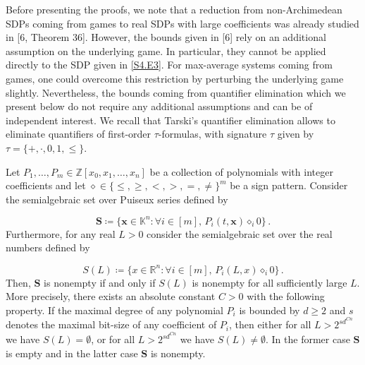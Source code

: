 Before presenting the proofs, we note that a reduction from non-Archimedean SDPs coming from games to real SDPs with large coefficients was already studied in [6, Theorem 36]. However, the bounds given in [6] rely on an additional assumption on the underlying game. In particular, they cannot be applied directly to the SDP given in \eqref{S4.E3}. For max-average systems coming from games, one could overcome this restriction by perturbing the underlying game slightly. Nevertheless, the bounds coming from quantifier elimination which we present below do not require any additional assumptions and can be of independent interest. We recall that Tarski’s quantifier elimination allows to eliminate quantifiers of first-order $\tau$-formulas, with signature $\tau$ given by $\tau=\{+,\cdot,0,1,\leq\}$.

\setcounter{theorem}{6}
\begin{theorem}\label{Thmtheorem7}
Let $P_{1},\dots,P_{m}\in\mathbb{Z}[x_{0},x_{1},\dots,x_{n}]$ be a collection of polynomials with integer coefficients and let $\diamond\in\{\leq,\geq,<,>,=,\neq\}^{m}$ be a sign pattern. Consider the semialgebraic set over Puiseux series defined by


\[
\bm{S}\coloneqq\{\bm{x}\in\mathbb{K}^{n}\colon\forall i\in[m],\,P_{i}(t,\bm{x})\diamond_{i}0\}\,.
\]
Furthermore, for any real $L>0$ consider the semialgebraic set over the real numbers defined by


\[
S(L)\coloneqq\{x\in\mathbb{R}^{n}\colon\forall i\in[m],\,P_{i}(L,x)\diamond_{i}0\}\,.
\]
Then, $\bm{S}$ is nonempty if and only if $S(L)$ is nonempty for all sufficiently large $L$. More precisely, there exists an absolute constant $C>0$ with the following property. If the maximal degree of any polynomial $P_{i}$ is bounded by $d\geq 2$ and $s$ denotes the maximal bit-size of any coefficient of $P_{i}$, then either for all $L>2^{sd^{Cn}}$ we have $S(L)=\emptyset$, or for all $L>2^{sd^{Cn}}$ we have $S(L)\neq\emptyset$. In the former case $\bm{S}$ is empty and in the latter case $\bm{S}$ is nonempty.

\end{theorem}

